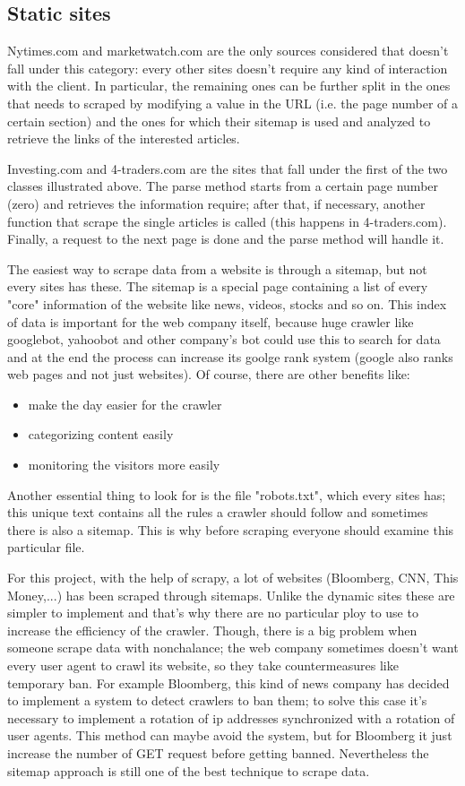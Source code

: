 \subsection{Static sites}
Nytimes.com and marketwatch.com are the only sources considered that doesn't fall under this category: every other sites doesn't require any kind of interaction with the client. In particular, the remaining ones can be further split in the ones that needs to scraped by modifying a value in the URL (i.e. the page number of a certain section) and the ones for which their sitemap is used and analyzed to retrieve the links of the interested articles. 
\par
Investing.com and 4-traders.com are the sites that fall under the first of the two classes illustrated above. The parse method starts from a certain page number (zero) and retrieves the information require; after that, if necessary, another function that scrape the single articles is called (this happens in 4-traders.com). Finally, a request to the next page is done and the parse method will handle it.
\par 
The easiest way to scrape data from a website is through a sitemap, but not every sites has these. The sitemap is a special page containing a list of every "core" information of the website like news, videos, stocks and so on. This index of data is important for the web company itself, because huge crawler like googlebot, yahoobot and other company's bot could use this to search for data and at the end the process can increase its goolge rank system (google also ranks web pages and not just websites). Of course, there are other benefits like:
\begin{itemize}
	\item make the day easier for the crawler
	\item categorizing content easily
	\item monitoring the visitors more easily
\end{itemize}
Another essential thing to look for is the file "robots.txt", which every sites has; this unique text contains all the rules a crawler should follow and sometimes there is also a sitemap. This is why before scraping everyone should examine this particular file. 
\par 
For this project, with the help of scrapy, a lot of websites (Bloomberg, CNN, This Money,...) has been scraped through sitemaps. Unlike the dynamic sites these are simpler to implement and that's why there are no particular ploy to use to increase the efficiency of the crawler. Though, there is a big problem when someone scrape data with nonchalance; the web company sometimes doesn't want every user agent to crawl its website, so they take countermeasures like temporary ban. For example Bloomberg, this kind of news company has decided to implement a system to detect crawlers to ban them; to solve this case it's necessary to implement a rotation of ip addresses synchronized with a rotation of user agents. This method can maybe avoid the system, but for Bloomberg it just increase the number of GET request before getting banned. Nevertheless the sitemap approach is still one of the best technique to scrape data.